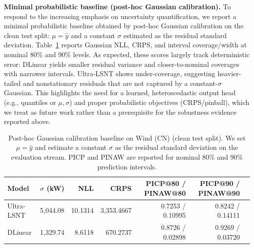 \documentclass[review,3p,times]{elsarticle}
\begin{document}
\noindent\textbf{Minimal probabilistic baseline (post-hoc Gaussian calibration).}
To respond to the increasing emphasis on uncertainty quantification, we report a minimal probabilistic baseline obtained by post-hoc Gaussian calibration on the clean test split: $\mu=\hat{y}$ and a constant $\sigma$ estimated as the residual standard deviation. Table~\ref{tab:prob_gaussian_minimal} reports Gaussian NLL, CRPS, and interval coverage/width at nominal 80\% and 90\% levels. As expected, these scores largely track deterministic error: DLinear yields smaller residual variance and closer-to-nominal coverages with narrower intervals. Ultra-LSNT shows under-coverage, suggesting heavier-tailed and nonstationary residuals that are not captured by a constant-$\sigma$ Gaussian. This highlights the need for a learned, heteroscedastic output head (e.g., quantiles or $\mu,\sigma$) and proper probabilistic objectives (CRPS/pinball), which we treat as future work rather than a prerequisite for the robustness evidence reported above.

\begin{table}[t]
\centering
\caption{Post-hoc Gaussian calibration baseline on Wind (CN) (clean test split). We set $\mu=\hat{y}$ and estimate a constant $\sigma$ as the residual standard deviation on the evaluation stream. PICP and PINAW are reported for nominal 80\% and 90\% prediction intervals.}
\label{tab:prob_gaussian_minimal}
\begin{tabular}{lrrrrrr}
\toprule
Model & $\sigma$ (kW) & NLL & CRPS & PICP@80 / PINAW@80 & PICP@90 / PINAW@90 \\
\midrule
Ultra-LSNT & 5,044.08 & 10.1314 & 3,353.4667 & 0.7253 / 0.10995 & 0.8242 / 0.14111 \\
DLinear & 1,329.74 & 8.6118 & 670.2737 & 0.8726 / 0.02898 & 0.9269 / 0.03720 \\
\bottomrule
\end{tabular}
\end{table}
\end{document}

